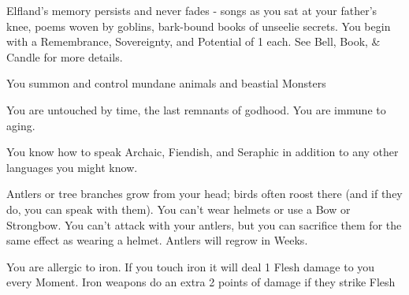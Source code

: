 {  


 \newpage


    
  Elfland's memory persists and never fades - songs as you sat at your father's knee, poems woven by goblins, bark-bound books of unseelie secrets. You begin with a Remembrance, Sovereignty, and Potential of 1 each.  See Bell, Book, \& Candle for more details.


   You summon and control mundane animals and beastial Monsters\footnotemark[\value{footnote}]

  
  You are untouched by time, the last remnants of godhood.  You are immune to aging.  


  You know how to speak Archaic, Fiendish, and Seraphic in addition to any other languages you might know.




  Antlers or tree branches grow from your head; birds often roost there (and if they do, you can speak with them).  You can't wear helmets or use a Bow or Strongbow. You can't attack with your antlers, but you can sacrifice them for the same effect as wearing a helmet. Antlers will regrow in Weeks.


  You are allergic to iron.  If you touch iron it will deal 1 Flesh damage to you every Moment.  Iron weapons do an extra 2 points of damage if they strike Flesh

}
